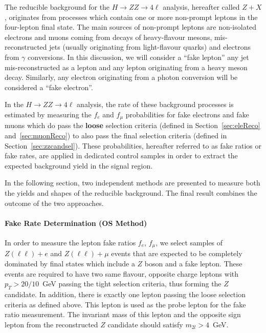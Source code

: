 The reducible background for the $H\to ZZ\to 4\ell $ analysis, hereafter called $Z+X$, originates from processes which contain one or more non-prompt leptons in the four-lepton final state. 
The main sources of non-prompt leptons are non-isolated electrons and muons coming from decays of heavy-flavour mesons, mis-reconstructed jets (usually originating from light-flavour quarks) and electrons from $\gamma$ conversions. 
In this discussion, we will consider a ``fake lepton'' any jet mis-reconstructed as a lepton and any lepton originating from a heavy meson decay.
Similarly, any electron originating from a photon conversion will be considered a ``fake electron''.

In the $H\to ZZ\to 4\ell $ analysis, the rate of these background processes is estimated by measuring the $f_{e}$ and $f_{\mu}$ probabilities for fake electrons and fake muons which do pass the {\bf loose} selection criteria (defined in Section~\ref{sec:eleReco} and~\ref{sec:muonReco}) to also pass the final selection criteria (defined in Section~\ref{sec:zzcandsel}).  
These probabilities, hereafter referred to as fake ratios or fake rates, are applied in dedicated control samples in order to extract the expected background yield in the signal region. 

In the following section, two independent methods are presented to measure both the yields and shapes of the reducible background. The final result combines the outcome of the two approaches. 

\paragraph{Fake Rate Determination (OS Method)}
In order to measure the lepton fake ratios $f_{e}$, $f_{\mu}$, we select samples of $Z(\ell\ell)+e$ and $Z(\ell\ell)+\mu$ events that are expected to be completely dominated by final states which include a $Z$ boson and a fake lepton. 
These events are required to have two same flavour, opposite charge leptons with $p_{T} > 20/10$~GeV passing the tight selection criteria, thus forming the $Z$ candidate. In addition, there is exactly one lepton passing the loose selection criteria as defined above. 
This lepton is used as the probe lepton for the fake ratio measurement. The invariant mass of this lepton and the opposite sign lepton from the reconstructed $Z$ candidate should satisfy $m_{2l} > 4$~GeV. 

